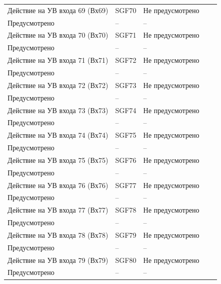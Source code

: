 \begin{longtable}{|>{\centering\arraybackslash}m{5.3cm}|>{\centering\arraybackslash}m{3.3cm}|>{\centering\arraybackslash}m{4.2cm}|>{\centering\arraybackslash}m{1.8cm}|>{\centering\arraybackslash}m{1cm}|}
\hline
\centering Действие на УВ входа 69 (Вх69)  & \centering SGF70 & \centering Не предусмотрено \\ Предусмотрено & \centering -- & \centering \arraybackslash -- \\
\hline
\centering Действие на УВ входа 70 (Вх70)  & \centering SGF71 & \centering Не предусмотрено \\ Предусмотрено & \centering -- & \centering \arraybackslash -- \\
\hline
\centering Действие на УВ входа 71 (Вх71)  & \centering SGF72 & \centering Не предусмотрено \\ Предусмотрено & \centering -- & \centering \arraybackslash -- \\
\hline
\centering Действие на УВ входа 72 (Вх72)  & \centering SGF73 & \centering Не предусмотрено \\ Предусмотрено & \centering -- & \centering \arraybackslash -- \\
\hline
\centering Действие на УВ входа 73 (Вх73)  & \centering SGF74 & \centering Не предусмотрено \\ Предусмотрено & \centering -- & \centering \arraybackslash -- \\
\hline
\centering Действие на УВ входа 74 (Вх74)  & \centering SGF75 & \centering Не предусмотрено \\ Предусмотрено & \centering -- & \centering \arraybackslash -- \\
\hline
\centering Действие на УВ входа 75 (Вх75)  & \centering SGF76 & \centering Не предусмотрено \\ Предусмотрено & \centering -- & \centering \arraybackslash -- \\
\hline
\centering Действие на УВ входа 76 (Вх76)  & \centering SGF77 & \centering Не предусмотрено \\ Предусмотрено & \centering -- & \centering \arraybackslash -- \\
\hline
\centering Действие на УВ входа 77 (Вх77)  & \centering SGF78 & \centering Не предусмотрено \\ Предусмотрено & \centering -- & \centering \arraybackslash -- \\
\hline
\centering Действие на УВ входа 78 (Вх78)  & \centering SGF79 & \centering Не предусмотрено \\ Предусмотрено & \centering -- & \centering \arraybackslash -- \\
\hline
\centering Действие на УВ входа 79 (Вх79)  & \centering SGF80 & \centering Не предусмотрено \\ Предусмотрено & \centering -- & \centering \arraybackslash -- \\

\end{longtable}
